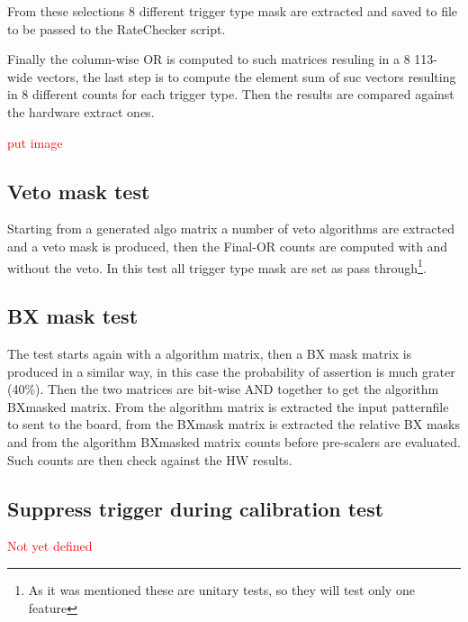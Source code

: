 \documentclass[a4paper,11pt]{article}
\begin{document}
From these selections 8 different trigger type mask are extracted and saved to file to be passed to the RateChecker script.

Finally the column-wise OR is computed to such matrices resuling in a 8 113-wide vectors, the last step is to compute the element sum of suc vectors resulting in 8 different counts for each trigger type. Then the results are compared against the hardware extract ones.

\textcolor{red}{put image}


\subsection{Veto mask test}

Starting from a generated algo matrix a number of veto algorithms are extracted and a veto mask is produced, then the Final-OR counts are computed with and without the veto. In this test all trigger type mask are set as pass through\footnote{As it was mentioned these are unitary tests, so they will test only one feature}.


\subsection{BX mask test}

The test starts again with a algorithm matrix, then a BX mask matrix is produced in a similar way, in this case the probability of assertion is much grater (40\%). Then the two matrices are bit-wise AND together to get the algorithm BXmasked matrix. From the algorithm matrix is extracted the input patternfile to sent to the board, from the BXmask matrix is extracted the relative BX masks and from the algorithm BXmasked matrix counts before pre-scalers are evaluated. Such counts are then check against the HW results. 

\subsection{Suppress trigger during calibration test}

\textcolor{red}{Not yet defined}
\end{document}
